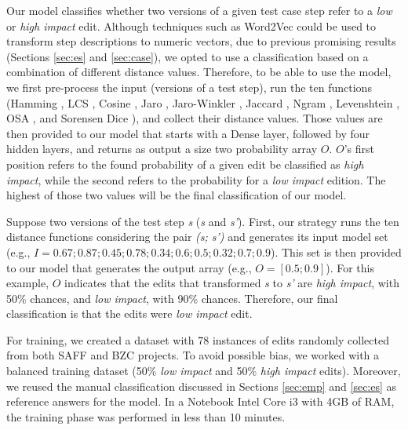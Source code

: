 Our model classifies whether two versions of a given test case step refer to a \textit{low} or \textit{high impact} edit. Although techniques such as Word2Vec \citep{rong2014word2vec} could be used to transform step descriptions to numeric vectors, due to previous promising results (Sections \ref{sec:es} and \ref{sec:case}), we opted to use a classification based on a combination of different distance values. Therefore, to be able to use the model, we first pre-process the input (versions of a test step), run the ten functions (Hamming \citep{hamming1950error}, LCS \citep{han2007efficient:LCS}, Cosine \citep{huang2008similaritycosine}, Jaro \citep{de1mahalanobis:jaro}, Jaro-Winkler \citep{de1mahalanobis:jaro}, Jaccard \citep{Lu2013SimilaridadeJaccard}, Ngram \citep{Kondrak2005ngram}, Levenshtein \citep{Levenshtein_SPD66}, OSA \citep{Damerau:1964}, and Sorensen Dice \citep{sorensen1948method}), and collect their distance values. Those values are then provided to our model that starts with a Dense layer, followed by four hidden layers, and returns as output a size two probability array $O$. $O$'s first position refers to the found probability of a given edit be classified as\textit{ high impact}, while the second refers to the probability for a \textit{low impact} edition. The highest of those two values will be the final classification of our model. 

Suppose two versions of the test step \textit{s} (\textit{s} and \textit{s'}). First, our strategy runs the ten distance functions considering the pair \textit{(s; s')} and generates its input model set (e.g., $I = {0.67; 0.87; 0.45; 0.78; 0.34; 0.6; 0.5; 0.32; 0.7; 0.9}$). This set is then provided to our model that generates the output array (e.g., $O = [0.5; 0.9]$). For this example, $O$ indicates that the edits that transformed \textit{s} to \textit{s'} are \textit{high impact}, with 50\% chances, and \textit{low impact}, with 90\% chances. Therefore, our final classification is that the edits were \textit{low impact} edit. 



For training, we created a dataset with 78 instances of edits randomly collected from both SAFF and BZC projects. To avoid possible bias, we worked with a balanced training dataset (50\% \textit{low impact} and 50\% \textit{high impact} edits). Moreover, we reused the manual classification discussed in Sections \ref{sec:emp} and \ref{sec:es} as reference answers for the model. In a Notebook Intel Core i3 with 4GB of RAM, the training phase was performed in less than 10 minutes.



